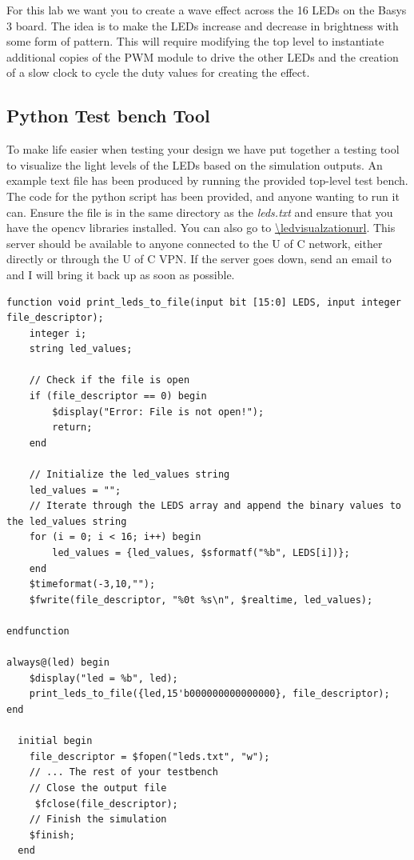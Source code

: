 For this lab we want you to create a wave effect across the 16 LEDs on the Basys 3 board. The idea is to make the LEDs increase and decrease in brightness with some form of pattern. This will require modifying the top level to instantiate additional copies of the PWM module to drive the other LEDs and the creation of a slow clock to cycle the duty values for creating the effect. 

\raggedright

\subsection{Python Test bench Tool}
To make life easier when testing your design we have put together a testing tool to visualize the light levels of the LEDs based on the simulation outputs. An example text file has been produced by running the provided top-level test bench. The code for the python script has been provided, and anyone wanting to run it can. Ensure the file is in the same directory as the \textit{leds.txt} and ensure that you have the opencv libraries installed. You can also go to \url{\ledvisualzationurl}. This server should be available to anyone connected to the U of C network, either directly or through the U of C VPN. If the server goes down, send an email to \labInstructorEmail and I will bring it back up as soon as possible. 
\begin{verbatim}
function void print_leds_to_file(input bit [15:0] LEDS, input integer file_descriptor);
    integer i;
    string led_values;

    // Check if the file is open
    if (file_descriptor == 0) begin
        $display("Error: File is not open!");
        return;
    end

    // Initialize the led_values string
    led_values = "";
    // Iterate through the LEDS array and append the binary values to the led_values string
    for (i = 0; i < 16; i++) begin
        led_values = {led_values, $sformatf("%b", LEDS[i])};
    end
    $timeformat(-3,10,"");
    $fwrite(file_descriptor, "%0t %s\n", $realtime, led_values);
    
endfunction

always@(led) begin
    $display("led = %b", led);
    print_leds_to_file({led,15'b000000000000000}, file_descriptor);
end

  initial begin   
    file_descriptor = $fopen("leds.txt", "w");
    // ... The rest of your testbench
    // Close the output file
     $fclose(file_descriptor);
    // Finish the simulation
    $finish;
  end
\end{verbatim}

